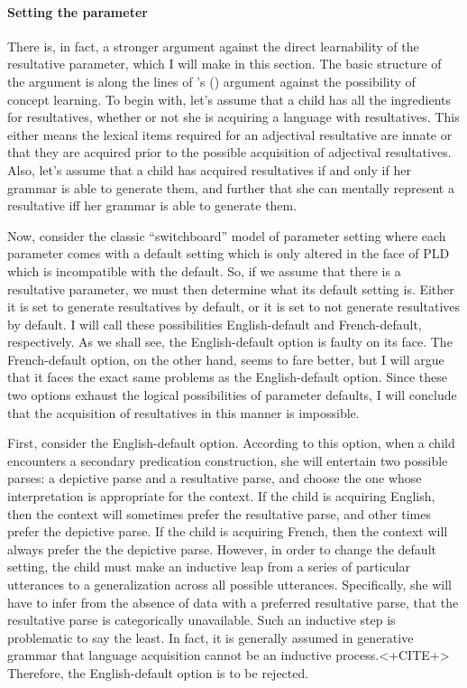 \documentclass[MilwayThesis]{subfiles}
\begin{document}
\paragraph{Setting the parameter}
There is, in fact, a stronger argument against the direct learnability of the resultative parameter, which I will make in this section.
The basic structure of the argument is along the lines of \citeauthor{fodor1975language}'s (\citeyear{fodor1975language}) argument against the possibility of concept learning.
To begin with, let's assume that a child has all the ingredients for resultatives, whether or not she is acquiring a language with resultatives.
This either means the lexical items required for an adjectival resultative are innate or that they are acquired prior to the possible acquisition of adjectival resultatives.
Also, let's assume that a child has acquired resultatives if and only if her grammar is able to generate them, and further that she can mentally represent a resultative iff her grammar is able to generate them.

Now, consider the classic ``switchboard'' model of parameter setting where each parameter comes with a default setting which is only altered in the face of PLD which is incompatible with the default.
So, if we assume that there is a resultative parameter, we must then determine what its default setting is.
Either it is set to generate resultatives by default, or it is set to not generate resultatives by default.
I will call these possibilities English-default and French-default, respectively.
As we shall see, the English-default option is faulty on its face.
The French-default option, on the other hand, seems to fare better, but I will argue that it faces the exact same problems as the English-default option.
Since these two options exhaust the logical possibilities of parameter defaults, I will conclude that the acquisition of resultatives in this manner is impossible.

First, consider the English-default option.
According to this option, when a child encounters a secondary predication construction, she will entertain two possible parses: a depictive parse and a resultative parse, and choose the one whose interpretation is appropriate for the context.
If the child is acquiring English, then the context will sometimes prefer the resultative parse, and other times prefer the depictive parse.
If the child is acquiring French, then the context will always prefer the the depictive parse.
However, in order to change the default setting, the child must make an inductive leap from a series of particular utterances to a generalization across all possible utterances.
Specifically, she will have to infer from the absence of data with a preferred resultative parse, that the resultative parse is categorically unavailable.
Such an inductive step is problematic to say the least.
In fact, it is generally assumed in generative grammar that language acquisition cannot be an inductive process.<+CITE+>
Therefore, the English-default option is to be rejected.
\end{document}
